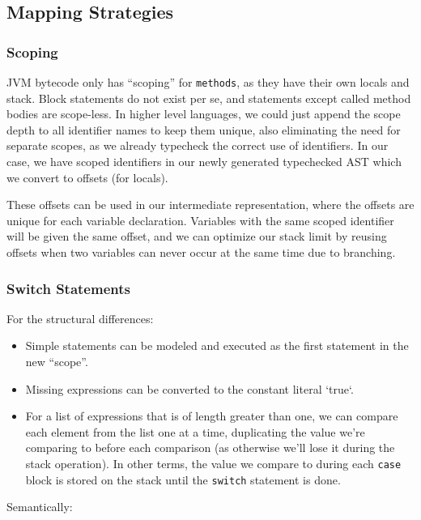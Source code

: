 \documentclass[11pt]{article}
\begin{document}
\subsection{Mapping Strategies}
\subsubsection{Scoping}
JVM bytecode only has ``scoping'' for \texttt{methods}, as they have
their own locals and stack. Block statements do not exist per se, and
statements except called method bodies are scope-less. In higher level
languages, we could just append the scope depth to all identifier
names to keep them unique, also eliminating the need for separate
scopes, as we already typecheck the correct use of identifiers. In our
case, we have scoped identifiers in our newly generated typechecked
AST which we convert to offsets (for locals).

These offsets can be used in our intermediate representation, where
the offsets are unique for each variable declaration. Variables with
the same scoped identifier will be given the same offset, and we can
optimize our stack limit by reusing offsets when two variables can
never occur at the same time due to branching.
\subsubsection{Switch Statements}
For the structural differences:
\begin{itemize}[noitemsep]
\item Simple statements can be modeled and executed as the first
  statement in the new ``scope''.
\item Missing expressions can be converted to the constant literal
  `true`.
\item For a list of expressions that is of length greater than one, we
  can compare each element from the list one at a time, duplicating
  the value we're comparing to before each comparison (as otherwise
  we'll lose it during the stack operation). In other terms, the value
  we compare to during each \texttt{case} block is stored on the stack
  until the \texttt{switch} statement is done.
\end{itemize}

\noindent Semantically:
\end{document}
